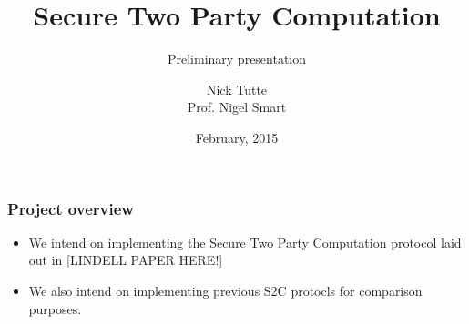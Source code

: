 \documentclass{beamer}
\begin{document}
  \title[Crisis]{Secure Two Party Computation}
  \subtitle{Preliminary presentation}
  \author[Author]{Nick Tutte\\[1ex]{\tiny Prof. Nigel Smart}}
  \date[Feb 2015]
  {February, 2015}
  \subject{Computer Science}
  \frame{\titlepage}


  \begin{frame}
    \frametitle{Project overview}
    \begin{itemize}
     \item We intend on implementing the Secure Two Party Computation protocol laid out in [LINDELL PAPER HERE!]
     \item We also intend on implementing previous S2C protocls for comparison purposes.
    \end{itemize}

  \end{frame}
\end{document}
